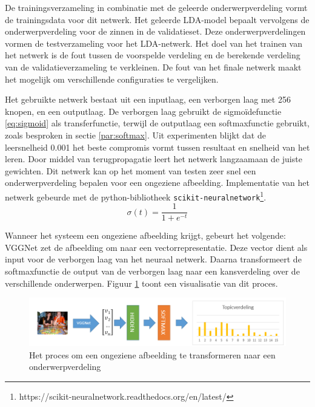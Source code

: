 De trainingsverzameling in combinatie met de geleerde onderwerpverdeling vormt de trainingsdata voor dit netwerk. 
Het geleerde LDA-model bepaalt vervolgens de onderwerpverdeling voor de zinnen in de validatieset. Deze onderwerpverdelingen vormen de testverzameling voor het LDA-netwerk. Het doel van het trainen van het netwerk is de fout tussen de voorspelde verdeling en de berekende verdeling van de validatieverzameling te verkleinen. De fout van het finale netwerk maakt het mogelijk om verschillende configuraties te vergelijken.

Het gebruikte netwerk bestaat uit een inputlaag, een verborgen laag met 256 knopen, en een outputlaag. De verborgen laag gebruikt de sigmo\"idefunctie \eqref{eq:sigmoid} als transferfunctie, terwijl de outputlaag een softmaxfunctie gebruikt, zoals besproken in sectie \ref{par:softmax}. Uit experimenten blijkt dat de leersnelheid 0.001 het beste compromis vormt tussen resultaat en snelheid van het leren.
Door middel van terugpropagatie leert het netwerk langzaamaan de juiste gewichten. Dit netwerk kan op het moment van testen zeer snel een onderwerpverdeling bepalen voor een ongeziene afbeelding. Implementatie van het netwerk gebeurde met de python-bibliotheek \texttt{scikit-neuralnetwork}\footnote{https://scikit-neuralnetwork.readthedocs.org/en/latest/}.
\begin{equation}
\sigma(t) = \frac{1}{1 + e^{-t}}
\label{eq:sigmoid}
\end{equation}

Wanneer het systeem een ongeziene afbeelding krijgt, gebeurt het volgende: VGGNet zet de afbeelding om naar een vectorrepresentatie. Deze vector dient als input voor de verborgen laag van het neuraal netwerk. Daarna transformeert de softmaxfunctie de output van de verborgen laag naar een kansverdeling over de verschillende onderwerpen. Figuur \ref{fig:learningLDA} toont een visualisatie van dit proces.


\begin{figure}[tb]
    \centering
    \includegraphics[width=\linewidth]{Images/LDANetwerk.PNG}
    \caption{Het proces om een ongeziene afbeelding te transformeren naar een onderwerpverdeling}
    \label{fig:learningLDA}
\end{figure}

